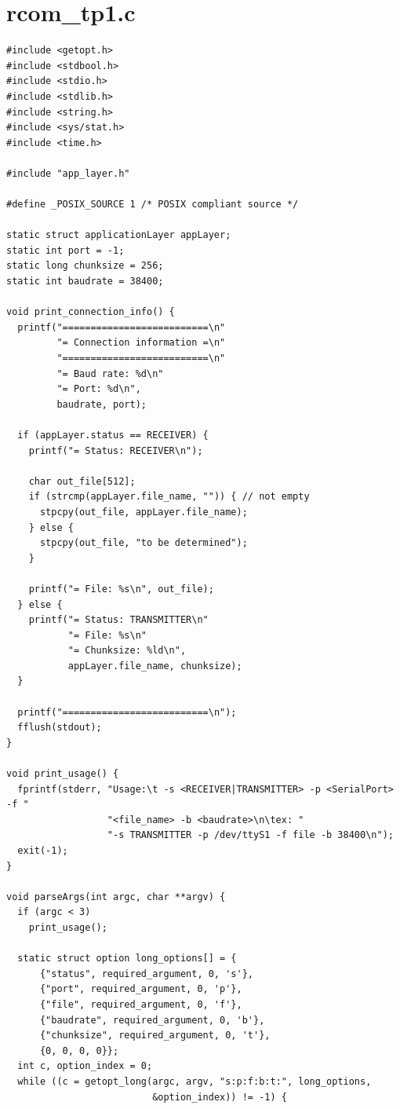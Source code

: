 \documentclass[11pt]{report}
\begin{document}
\section{rcom\_tp1.c}

\begin{lstlisting}
#include <getopt.h>
#include <stdbool.h>
#include <stdio.h>
#include <stdlib.h>
#include <string.h>
#include <sys/stat.h>
#include <time.h>

#include "app_layer.h"

#define _POSIX_SOURCE 1 /* POSIX compliant source */

static struct applicationLayer appLayer;
static int port = -1;
static long chunksize = 256;
static int baudrate = 38400;

void print_connection_info() {
  printf("==========================\n"
         "= Connection information =\n"
         "==========================\n"
         "= Baud rate: %d\n"
         "= Port: %d\n",
         baudrate, port);

  if (appLayer.status == RECEIVER) {
    printf("= Status: RECEIVER\n");

    char out_file[512];
    if (strcmp(appLayer.file_name, "")) { // not empty
      stpcpy(out_file, appLayer.file_name);
    } else {
      stpcpy(out_file, "to be determined");
    }

    printf("= File: %s\n", out_file);
  } else {
    printf("= Status: TRANSMITTER\n"
           "= File: %s\n"
           "= Chunksize: %ld\n",
           appLayer.file_name, chunksize);
  }

  printf("==========================\n");
  fflush(stdout);
}

void print_usage() {
  fprintf(stderr, "Usage:\t -s <RECEIVER|TRANSMITTER> -p <SerialPort> -f "
                  "<file_name> -b <baudrate>\n\tex: "
                  "-s TRANSMITTER -p /dev/ttyS1 -f file -b 38400\n");
  exit(-1);
}

void parseArgs(int argc, char **argv) {
  if (argc < 3)
    print_usage();

  static struct option long_options[] = {
      {"status", required_argument, 0, 's'},
      {"port", required_argument, 0, 'p'},
      {"file", required_argument, 0, 'f'},
      {"baudrate", required_argument, 0, 'b'},
      {"chunksize", required_argument, 0, 't'},
      {0, 0, 0, 0}};
  int c, option_index = 0;
  while ((c = getopt_long(argc, argv, "s:p:f:b:t:", long_options,
                          &option_index)) != -1) {


\end{lstlisting}
\end{document}

